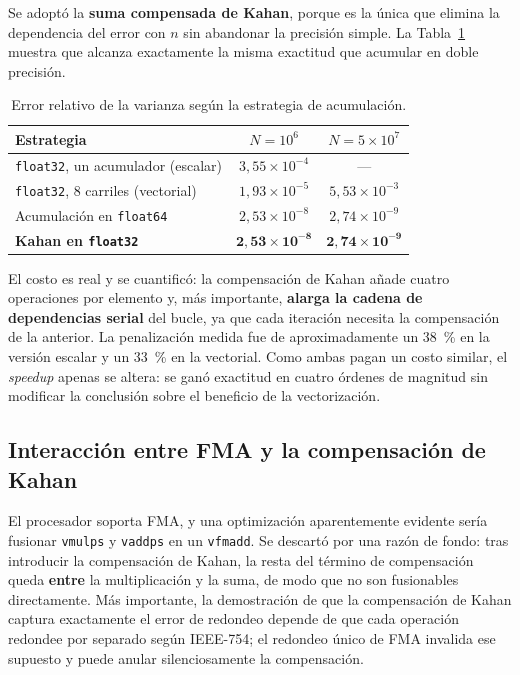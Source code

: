 \documentclass[journal]{IEEEtran}
\begin{document}
Se adoptó la \textbf{suma compensada de Kahan}, porque es la única que
elimina la dependencia del error con $n$ sin abandonar la precisión
simple. La Tabla~\ref{tab:kahan} muestra que alcanza exactamente la misma
exactitud que acumular en doble precisión.

\begin{table}[h]
\centering
\caption{Error relativo de la varianza según la estrategia de
  acumulación.}
\label{tab:kahan}
\footnotesize
\setlength{\tabcolsep}{3pt}
\begin{tabular}{|l|c|c|}
\hline
\textbf{Estrategia} & $N = 10^6$ & $N = 5\times10^7$ \\ \hline
\texttt{float32}, un acumulador (escalar) & $3,55\times10^{-4}$ & --- \\ \hline
\texttt{float32}, 8 carriles (vectorial)  & $1,93\times10^{-5}$ & $5,53\times10^{-3}$ \\ \hline
Acumulación en \texttt{float64}          & $2,53\times10^{-8}$ & $2,74\times10^{-9}$ \\ \hline
\textbf{Kahan en \texttt{float32}}        & $\mathbf{2,53\times10^{-8}}$ & $\mathbf{2,74\times10^{-9}}$ \\ \hline
\end{tabular}
\end{table}

El costo es real y se cuantificó: la compensación de Kahan añade
cuatro operaciones por elemento y, más importante, \textbf{alarga la
cadena de dependencias serial} del bucle, ya que cada iteración necesita
la compensación de la anterior. La penalización medida fue de
aproximadamente un \SI{38}{\percent} en la versión escalar y un \SI{33}{\percent} en la
vectorial. Como ambas pagan un costo similar, el \textit{speedup} apenas
se altera: se ganó exactitud en cuatro órdenes de magnitud sin
modificar la conclusión sobre el beneficio de la vectorización.

\subsection{Interacción entre FMA y la compensación de Kahan}

El procesador soporta FMA, y una optimización aparentemente evidente
sería fusionar \texttt{vmulps} y \texttt{vaddps} en un \texttt{vfmadd}.
Se descartó por una razón de fondo: tras introducir la compensación
de Kahan, la resta del término de compensación queda \textbf{entre} la
multiplicación y la suma, de modo que no son fusionables directamente.
Más importante, la demostración de que la compensación de Kahan
captura exactamente el error de redondeo depende de que cada operación
redondee por separado según IEEE-754; el redondeo único de FMA
invalida ese supuesto y puede anular silenciosamente la compensación.
\end{document}
